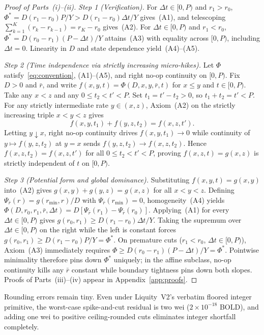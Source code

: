 \begin{proof}[Proof of Parts~(i)--(ii)]
\emph{Step 1 (Verification).} For $\Delta t \in [0, P)$ and $r_1 > r_0$, $\Phi^* = D(r_1 - r_0)P/Y > D(r_1 - r_0)\Delta t/Y$ gives~(A1), and telescoping $\sum_{k=1}^K (r_k - r_{k-1}) = r_K - r_0$ gives~(A2). For $\Delta t \in [0, P)$ and $r_1 < r_0$, $\Phi^* = D(r_0 - r_1)(P - \Delta t)/Y$ attains~(A3) with equality across $[0, P)$, including $\Delta t = 0$. Linearity in $D$ and state dependence yield~(A4)--(A5).

\emph{Step 2 (Time independence via strictly increasing micro-hikes).} Let $\Phi$ satisfy~\eqref{eq:convention}, (A1)--(A5), and right no-op continuity on $[0, P)$. Fix $D > 0$ and $\bar{r}$, and write $f(x, y, t) = \Phi(D, x, y, \bar{r}, t)$ for $x \le y$ and $t \in [0, P)$. Take any $x < z$ and any $0 \le t_2 < t' < P$. Set $t_1 = t' - t_2 > 0$, so $t_1 + t_2 = t' < P$. For any strictly intermediate rate $y \in (x, z)$, Axiom~(A2) on the strictly increasing triple $x < y < z$ gives
\[
f(x, y, t_1) + f(y, z, t_2) = f(x, z, t').
\]
Letting $y \downarrow x$, right no-op continuity drives $f(x, y, t_1) \to 0$ while continuity of $y \mapsto f(y, z, t_2)$ at $y = x$ sends $f(y, z, t_2) \to f(x, z, t_2)$. Hence $f(x, z, t_2) = f(x, z, t')$ for all $0 \le t_2 < t' < P$, proving $f(x, z, t) = g(x, z)$ is strictly independent of $t$ on $[0, P)$.

\emph{Step 3 (Potential form and global dominance).} Substituting $f(x, y, t) = g(x, y)$ into~(A2) gives $g(x, y) + g(y, z) = g(x, z)$ for all $x < y < z$. Defining $\Psi_{\bar{r}}(r) = g(r_{\min}, r)/D$ with $\Psi_{\bar{r}}(r_{\min}) = 0$, homogeneity~(A4) yields $\Phi(D, r_0, r_1, \bar{r}, \Delta t) = D[\Psi_{\bar{r}}(r_1) - \Psi_{\bar{r}}(r_0)]$. Applying~(A1) for every $\Delta t \in [0, P)$ gives $g(r_0, r_1) \ge D(r_1 - r_0)\Delta t/Y$. Taking the supremum over $\Delta t \in [0, P)$ on the right while the left is constant forces $g(r_0, r_1) \ge D(r_1 - r_0)P/Y = \Phi^*$. On premature cuts ($r_1 < r_0$, $\Delta t \in [0, P)$), Axiom~(A3) immediately requires $\Phi \ge D(r_0 - r_1)(P - \Delta t)/Y = \Phi^*$. Pointwise minimality therefore pins down $\Phi^*$ uniquely; in the affine subclass, no-op continuity kills any $\bar{r}$ constant while boundary tightness pins down both slopes. Proofs of Parts~(iii)--(iv) appear in Appendix~\ref{app:proofs}.
\end{proof}

Rounding errors remain tiny. Even under Liquity~V2's verbatim floored integer primitive, the worst-case spike-and-cut residual is two wei ($2 \times 10^{-18}$ BOLD), and adding one wei to positive ceiling-rounded cuts eliminates integer shortfall completely.

